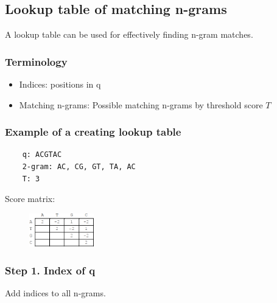 %
% 

%
%
\subsection{Lookup table of matching n-grams}
A lookup table can be used for effectively finding n-gram matches.

%
%
\subsubsection*{Terminology} 
\begin{itemize}
\item Indices: positions in q
\item Matching n-grams: Possible matching n-grams by threshold score $T$
\end{itemize}

%
%
\subsubsection*{Example of a creating lookup table} 

\begin{multicols}{2}
\begin{verbatim}
    q: ACGTAC 
    2-gram: AC, CG, GT, TA, AC
    T: 3
\end{verbatim}
\vfill\null
\columnbreak

Score matrix:
\begin{figure}[H]
      \includegraphics[width=0.25\textwidth]{fig05/score_matrix.png}
\end{figure}

\end{multicols} 

\medskip  

%
%
\subsubsection*{Step 1. Index of q} 
Add indices to all n-grams.

